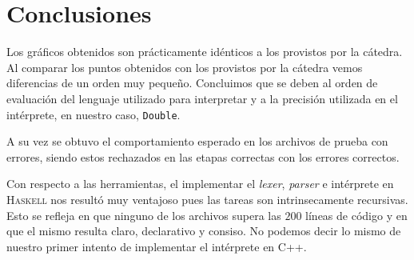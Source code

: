 \section{Conclusiones}

Los gr\'aficos obtenidos son pr\'acticamente id\'enticos a los provistos
por la c\'atedra. Al comparar los puntos obtenidos con los provistos por la
c\'atedra vemos diferencias de un orden muy peque\~no. Concluimos que se deben
al orden de evaluaci\'on del lenguaje utilizado para interpretar y a la precisi\'on
utilizada en el int\'erprete, en nuestro caso, \texttt{Double}.

A su vez se obtuvo el comportamiento esperado en los archivos de prueba con 
errores, siendo estos rechazados en las etapas correctas con los errores
correctos. 

Con respecto a las herramientas, el implementar el \textit{lexer}, \textit{parser} e int\'erprete
en \textsc{Haskell} nos result\'o muy ventajoso pues las tareas son intrinsecamente
recursivas. Esto se refleja en que ninguno de los archivos supera
las $200$ l\'ineas de c\'odigo y en que el mismo resulta claro, declarativo y
consiso. No podemos decir lo mismo de nuestro primer intento de implementar el
int\'erprete en \textsc{C++}.

